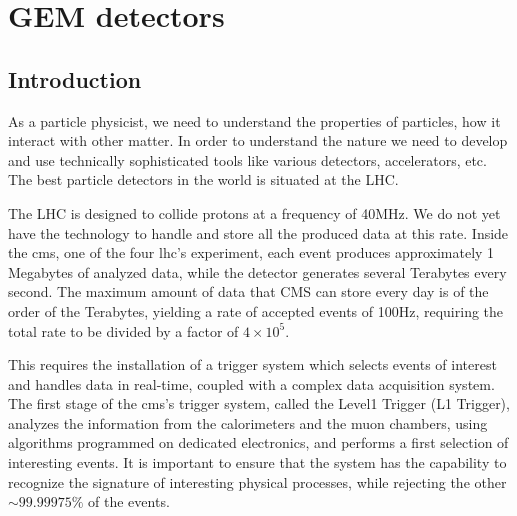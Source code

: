 \chapter{GEM detectors }\label{ch:gem}

\section{Introduction}
As a particle physicist, we need to understand the properties of particles, how it interact with other matter. %
In order to understand the nature we need to develop and use technically sophisticated tools like various detectors, accelerators, etc.
The best particle detectors in the world is situated at the LHC. %

The LHC is designed to collide protons at a frequency of 40MHz. We do not yet have the technology to handle and store all the produced data at this rate. Inside the {cms}, one of the four {lhc}'s experiment, each event produces approximately 1 Megabytes of analyzed data, while the detector generates several Terabytes every second. The maximum amount of data that CMS can store every day is of the order of the Terabytes, yielding a rate of accepted events of 100Hz, requiring the total rate to be divided by a factor of $4\times 10^5$.

This requires the installation of a trigger system which selects events of interest and handles data in real-time, coupled with a complex data acquisition system. The first stage of the {cms}'s trigger system, called the Level1 Trigger (L1 Trigger), analyzes the information from the calorimeters and the muon chambers, using algorithms programmed on dedicated electronics, and performs a first selection of interesting events. It is important to ensure that the system has the capability to recognize the signature of interesting physical processes, while rejecting the other $\sim 99.99975\%$ of the events.

